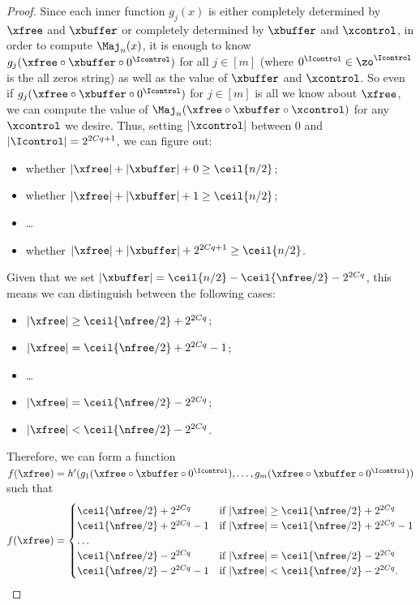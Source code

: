 \begin{proof}
Since each inner function $g_j(x)$ is either completely determined by $\xfree$ and $\xbuffer$ or completely determined by $\xbuffer$ and $\xcontrol$, in order to compute $\Maj_n(x)$, it is enough to know $g_j(\xfree \circ \xbuffer \circ 0^{\Icontrol})$ for all $j \in [m]$ (where $0^{\Icontrol} \in \zo^{\Icontrol}$ is the all zeros string) as well as the value of $\xbuffer$ and $\xcontrol$.
So even if $g_j(\xfree \circ \xbuffer \circ 0^{\Icontrol})$ for $j \in [m]$ is all we know about $\xfree$, we can compute the value of $\Maj_n(\xfree \circ \xbuffer \circ \xcontrol)$ for any $\xcontrol$ we desire.
Thus, setting $|\xcontrol|$ between $0$ and $|\Icontrol|=2^{2Cq+1}$, we can figure out:
\begin{itemize}
    \item whether $|\xfree| + |\xbuffer| + 0 \geq \ceil{n/2}$;
    \item whether $|\xfree| + |\xbuffer| + 1 \geq \ceil{n/2}$;
    \item \ldots
    \item whether $|\xfree| + |\xbuffer| + 2^{2Cq+1} \geq \ceil{n/2}$.
\end{itemize}
Given that we set $|\xbuffer| = \ceil{n/2} - \ceil{\nfree/2} - 2^{2Cq}$, this means we can distinguish between the following cases:
\begin{itemize}
    \item $|\xfree| \geq \ceil{\nfree/2} + 2^{2Cq}$;
    \item $|\xfree| = \ceil{\nfree/2}+2^{2Cq}-1$;
    \item \ldots
    \item $|\xfree| = \ceil{\nfree/2}-2^{2Cq}$;
    \item $|\xfree| < \ceil{\nfree/2}-2^{2Cq}$.
\end{itemize}
Therefore, we can form a function $f(\xfree) = h'(g_1(\xfree \circ \xbuffer \circ 0^{\Icontrol}), \ldots, g_m(\xfree \circ \xbuffer \circ 0^{\Icontrol}))$ such that
\[
f(\xfree) = 
\begin{cases}
    \ceil{\nfree/2} + 2^{2Cq} & \text{if $|\xfree| \geq \ceil{\nfree/2} + 2^{2Cq}$}\\
    \ceil{\nfree/2} + 2^{2Cq}-1 & \text{if $|\xfree| = \ceil{\nfree/2} + 2^{2Cq}-1$}\\
    \ldots &\\
    \ceil{\nfree/2}-2^{2Cq} & \text{if $|\xfree| = \ceil{\nfree/2}-2^{2Cq}$}\\
    \ceil{\nfree/2}-2^{2Cq}-1 & \text{if $|\xfree| < \ceil{\nfree/2}-2^{2Cq}$.}
\end{cases}
\]


\end{proof}
